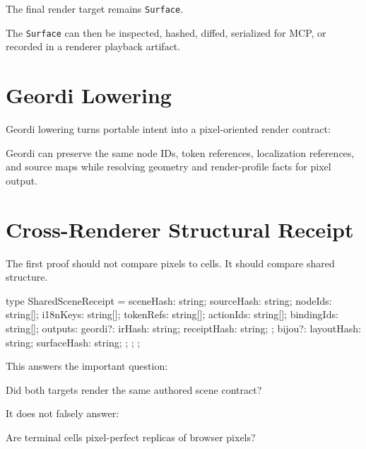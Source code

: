 The final render target remains \texttt{S\allowbreak{}u\allowbreak{}r\allowbreak{}f\allowbreak{}a\allowbreak{}c\allowbreak{}e}.



The \texttt{S\allowbreak{}u\allowbreak{}r\allowbreak{}f\allowbreak{}a\allowbreak{}c\allowbreak{}e} can then be inspected, hashed, diffed, serialized for MCP, or recorded in a renderer playback artifact.

\section{Geordi Lowering}\label{record-138-geordi-lowering}

Geordi lowering turns portable intent into a pixel-oriented render contract:



Geordi can preserve the same node IDs, token references, localization references, and source maps while resolving geometry and render-profile facts for pixel output.

\section{Cross-Renderer Structural Receipt}\label{record-138-cross-renderer-structural-receipt}

The first proof should not compare pixels to cells. It should compare shared structure.

\begin{CodeBlock}
type SharedSceneReceipt = {
  sceneHash: string;
  sourceHash: string;
  nodeIds: string[];
  i18nKeys: string[];
  tokenRefs: string[];
  actionIds: string[];
  bindingIds: string[];
  outputs: {
    geordi?: {
      irHash: string;
      receiptHash: string;
    };
    bijou?: {
      layoutHash: string;
      surfaceHash: string;
    };
  };
};
\end{CodeBlock}

This answers the important question:

\begin{CodeBlock}
Did both targets render the same authored scene contract?
\end{CodeBlock}

It does not falsely answer:

\begin{CodeBlock}
Are terminal cells pixel-perfect replicas of browser pixels?
\end{CodeBlock}

